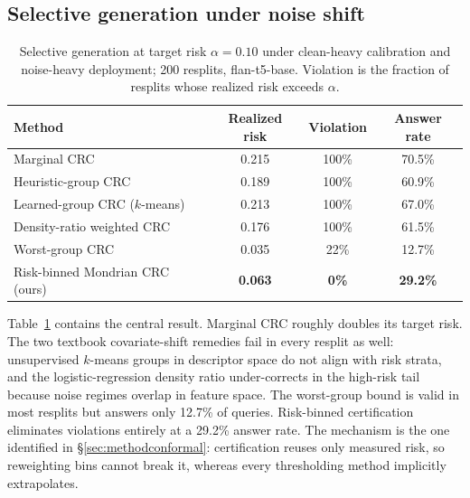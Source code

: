\documentclass[sn-basic]{sn-jnl}
\theoremstyle{thmstyleone}
\theoremstyle{thmstyletwo}
\begin{document}
\subsection{Selective generation under noise shift}\label{sec:conformal}

\begin{table}[tbp]
\centering\small
\caption{Selective generation at target risk $\alpha = 0.10$ under
clean-heavy calibration and noise-heavy deployment; 200 resplits,
flan-t5-base. Violation is the fraction of resplits whose realized risk
exceeds $\alpha$.}
\label{tab:crc}
\begin{tabular}{lccc}
\toprule
Method & Realized risk & Violation & Answer rate \\
\midrule
Marginal CRC                    & 0.215 & 100\% & 70.5\% \\
Heuristic-group CRC             & 0.189 & 100\% & 60.9\% \\
Learned-group CRC ($k$-means)   & 0.213 & 100\% & 67.0\% \\
Density-ratio weighted CRC      & 0.176 & 100\% & 61.5\% \\
Worst-group CRC                 & 0.035 & 22\%  & 12.7\% \\
Risk-binned Mondrian CRC (ours) & \textbf{0.063} & \textbf{0\%} & \textbf{29.2\%} \\
\bottomrule
\end{tabular}
\end{table}



Table~\ref{tab:crc} contains the central result. Marginal CRC roughly doubles its target risk. The two textbook
covariate-shift remedies fail in every resplit as well: unsupervised
$k$-means groups in descriptor space do not align with risk strata, and
the logistic-regression density ratio under-corrects in the high-risk
tail because noise regimes overlap in feature space. The worst-group
bound is valid in most resplits but answers only 12.7\% of queries.
Risk-binned certification eliminates violations entirely at a 29.2\%
answer rate. The mechanism is the one identified in
\S\ref{sec:methodconformal}: certification reuses only measured risk,
so reweighting bins cannot break it, whereas every thresholding method
implicitly extrapolates.
\end{document}
